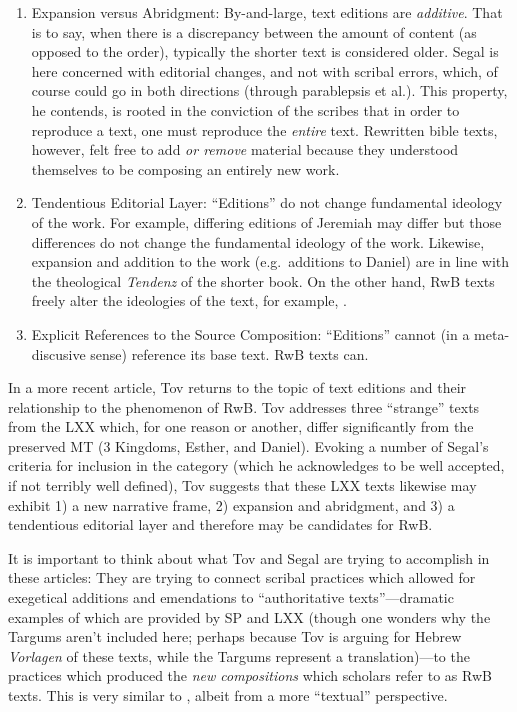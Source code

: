 \begin{enumerate}
\def\labelenumi{\arabic{enumi}.}
\setcounter{enumi}{3}
\item
  Expansion versus Abridgment: By-and-large, text editions are
  \emph{additive}. That is to say, when there is a discrepancy between
  the amount of content (as opposed to the order), typically the shorter
  text is considered older. Segal is here concerned with editorial
  changes, and not with scribal errors, which, of course could go in
  both directions (through parablepsis et al.). This property, he
  contends, is rooted in the conviction of the scribes that in order to
  reproduce a text, one must reproduce the \emph{entire}
  text.\autocite[24]{segal_henze2005} Rewritten bible texts, however,
  felt free to add \emph{or remove} material because they understood
  themselves to be composing an entirely new
  work.\autocite[24]{segal_henze2005}
\item
  Tendentious Editorial Layer: ``Editions'' do not change fundamental
  ideology of the work. For example, differing editions of Jeremiah may
  differ but those differences do not change the fundamental ideology of
  the work. Likewise, expansion and addition to the work (e.g.~additions
  to Daniel) are in line with the theological \emph{Tendenz} of the
  shorter book. On the other hand, RwB texts freely alter the ideologies
  of the text, for example,
  \jub.\autocite[25]{segal_henze2005}
\item
  Explicit References to the Source Composition: ``Editions'' cannot (in
  a meta-discusive sense) reference its base text. RwB texts can.
\end{enumerate}

In a more recent article, Tov returns to the topic of text editions and
their relationship to the phenomenon of
RwB\autocite{tov_krarrer-kraus2008}. Tov addresses three ``strange''
texts from the LXX which, for one reason or another, differ
significantly from the preserved MT (3 Kingdoms, Esther, and Daniel).
Evoking a number of Segal's criteria\autocite{segal_henze2005} for
inclusion in the category (which he acknowledges to be well accepted, if
not terribly well defined), Tov suggests that these LXX texts likewise
may exhibit 1) a new narrative frame, 2) expansion and abridgment, and
3) a tendentious editorial layer and therefore may be candidates for
RwB.

It is important to think about what Tov and Segal are trying to
accomplish in these articles: They are trying to connect scribal
practices which allowed for exegetical additions and emendations to
``authoritative texts''---dramatic examples of which are provided by SP
and LXX (though one wonders why the Targums aren't included here;
perhaps because Tov is arguing for Hebrew \emph{Vorlagen} of these
texts, while the Targums represent a translation)---to the practices
which produced the \emph{new compositions} which scholars refer to as
RwB texts. This is very similar to \vermes, albeit from
a more ``textual'' perspective.

